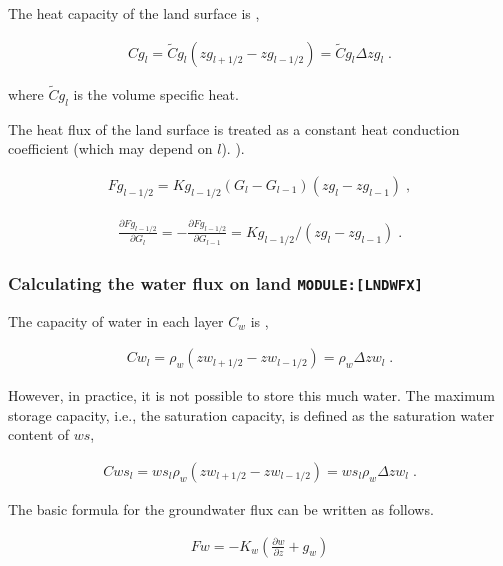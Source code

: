 The heat capacity of the land surface is ,

\begin{eqnarray}
  Cg_{l}  = \tilde{C}g_{l}(zg_{l+1/2} - zg_{l-1/2})
          = \tilde{C}g_{l} \Delta zg_{l} \; .
\end{eqnarray}

where \(\tilde{C}g_{l}\) is the volume specific heat.

The heat flux of the land surface is treated as a constant heat
conduction coefficient (which may depend on \(l\)). ).

\begin{eqnarray}
  Fg_{l-1/2} = Kg_{l-1/2} (G_l - G_{l-1})(zg_l - zg_{l-1}) \; ,
\end{eqnarray}

\begin{eqnarray}
  \frac{\partial Fg_{l-1/2}}{\partial G_l} = - \frac{\partial Fg_{l-1/2}}{\partial G_{l-1}}
 = Kg_{l-1/2}/(zg_l - zg_{l-1}) \; .
\end{eqnarray}

\hypertarget{calculating-the-water-flux-on-land-modulelndwfx}{%
\subsubsection{\texorpdfstring{Calculating the water flux on land
\texttt{MODULE:{[}LNDWFX{]}}}{Calculating the water flux on land MODULE:{[}LNDWFX{]}}}\label{calculating-the-water-flux-on-land-modulelndwfx}}

The capacity of water in each layer \(C_w\) is ,

\begin{eqnarray}
  Cw_{l}  = \rho_w (zw_{l+1/2} - zw_{l-1/2}) 
          = \rho_w \Delta zw_{l} \; .
\end{eqnarray}

However, in practice, it is not possible to store this much water. The
maximum storage capacity, i.e., the saturation capacity, is defined as
the saturation water content of \(ws\),

\begin{eqnarray}
  Cws_{l}  = ws_{l} \rho_w (zw_{l+1/2} - zw_{l-1/2})
           = ws_{l} \rho_w \Delta zw_{l} \; .
\end{eqnarray}

The basic formula for the groundwater flux can be written as follows.

\begin{eqnarray}
  F{w} = - K_{w} \left( \frac{\partial w}{\partial z} + g_w \right)
\end{eqnarray}

